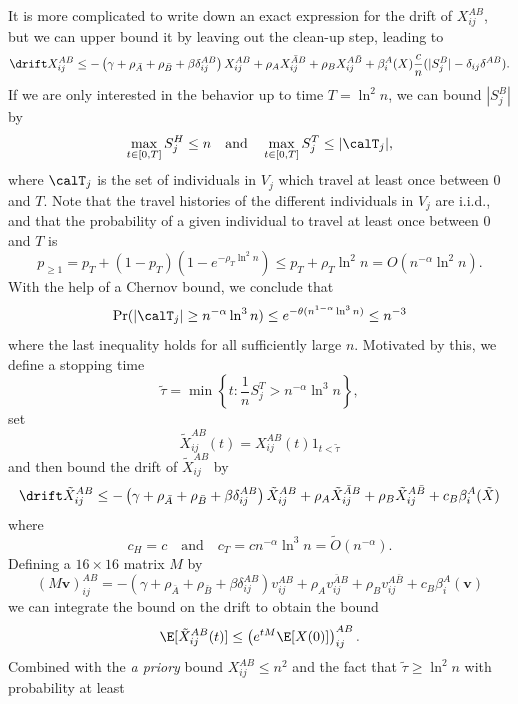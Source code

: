 \documentclass[11pt]{article}
\begin{document}
It is more complicated to write down an exact expression for the drift of $X_{ij}^{AB}$,
but we can upper bound it by leaving out the clean-up step, leading to
$$
\drift X_{ij}^{AB}\leq 
-\left(\gamma+\rho_{\bar A}+\rho_{\bar B}+\beta \delta_{ij}^{AB}\right)  X_{ij}^{AB}
+\rho_{ A}X_{ij}^{\bar A B}+\rho_{B}X_{ij}^{A\bar B}
+\beta_i^A (X)\frac cn (|S_j^B|-\delta_{ij}\delta^{AB}).
$$
If we are only interested in the behavior up to time $T=\ln^2n$,
we can bound $|S_j^B|$ by 
$$
\max_{t\in [0,T]}S_j^H\leq n\quad\text{and}\quad
\max_{t\in [0,T]}S_j^T\leq |\calT_j|,
$$
where $\calT_j$ is the set of individuals in $V_j$ which travel at least once between $0$ and $T$.  
Note that the travel histories of the different individuals in $V_j$ are i.i.d., and that the probability of a given individual to travel at least once between $0$ and $T$ is
$$
p_{\geq 1}=p_T+(1-p_T)(1-e^{-\rho_T \ln^2 n})\leq p_T+\rho_T\ln^2 n=O(n^{-\alpha}\ln^2n).
$$
With the help of a Chernov bound, we conclude
that
$$
\Pr(|\calT_j|\geq n^{-\alpha} \ln^3 n)\leq e^{-\theta (n^{1-\alpha}\ln^3 n)}\leq n^{-3}
$$
where the last inequality holds for all sufficiently large $n$. 
 Motivated by this, we define a stopping time
$$ 
\tilde\tau=\min\left\{t\colon \frac 1n S_j^T> n^{-\alpha}\ln^3n\right\},
$$
set
\begin{equation}  \label{tilde-X}
\tilde X_{ij}^{AB}(t)=X_{ij}^{AB}(t) 1_{t<\tilde\tau}  
\end{equation}
and then bound the drift of $\tilde X_{ij}^{AB}$
by
\begin{equation}\label{tilde-X-drift-upper-bound}
     \drift \tilde X_{ij}^{AB}\leq
 -\left(\gamma+\rho_{\bar A}+\rho_{\bar B}+\beta \delta_{ij}^{AB}\right) \tilde X_{ij}^{AB}
+\rho_{ A}\tilde X_{ij}^{\bar A B}+\rho_{B}\tilde X_{ij}^{A\bar B}
+c_B\beta_i^A (\tilde X) 
\end{equation}
where 
\begin{equation}\label{tilde-rho-A}
c_H=c\quad\text{and}\quad
  c_T=c n^{-\alpha}\ln^3n=\tilde O(n^{-\alpha}).
\end{equation}
Defining a $16\times 16$ matrix $M$ by
\begin{equation}\label{M-def}
(M\mathbf v)_{ij}^{AB}=
-\left(\gamma+\rho_{\bar A}+\rho_{\bar B}+\beta \delta_{ij}^{AB}\right) v_{ij}^{AB}
+\rho_{A}v_{ij}^{\bar A B}+\rho_{B}v_{ij}^{A\bar B}
+c_B\beta_i^A (\mathbf v)      
\end{equation}
we can integrate the bound on the drift to obtain the bound
\[
  \E[\tilde X_{ij}^{AB}(t)]\leq \left(e^{tM}\E[X(0)]\right)_{ij}^{AB}.  
\]
Combined with the  {\it a priory} bound $X_{ij}^{AB}\leq n^2$ and the fact that $\tilde \tau\geq \ln^2 n$ with probability at least
\end{document}
